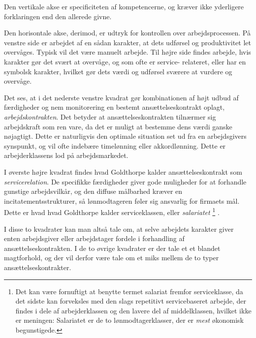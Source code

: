 Den vertikale akse er specificiteten af kompetencerne, og kræver ikke yderligere forklaringen end den allerede givne.

Den horisontale akse, derimod, er udtryk for kontrollen over arbejdsprocessen. På venstre side er arbejdet af en sådan karakter, at dets udførsel og produktivitet let overvåges. Typisk vil det være manuelt arbejde.   
Til højre side findes arbejde, hvis karakter gør det svært at overvåge, og som ofte er service- relateret, eller har en symbolsk karakter, hvilket gør dets værdi og udførsel sværere at vurdere og overvåge. 

Det ses, at i det nederste venstre kvadrat gør kombinationen af højt udbud af færdigheder og nem monitorering en bestemt ansættelseskontrakt oplagt, \emph{arbejdskontrakten}. Det betyder at ansættelseskontrakten tilnærmer sig arbejdskraft som ren vare, da det er muligt at bestemme dens værdi ganske nøjagtigt. Dette er naturligvis den optimale situation set ud fra en arbejdsgivers synspunkt, og vil ofte indebære timelønning eller akkordlønning. Dette er arbejderklassens lod på arbejdsmarkedet. %

I øverste højre kvadrat findes hvad Goldthorpe kalder ansættelseskontrakt som \emph{servicerelation}. De specifikke færdigheder giver gode muligheder for at forhandle gunstige arbejdsvilkår, og den diffuse målbarhed  kræver en incitatementsstrukturer, så lønmodtageren føler sig ansvarlig for firmaets mål. Dette er hvad hvad Goldthorpe kalder serviceklassen, eller \emph{salariatet}%
%
\footnote{Det kan være fornuftigt at benytte termet salariat fremfor serviceklasse, da det sidste kan forveksles med den slags repetitivt servicebaseret arbejde, der findes i dele af arbejderklassen og den lavere del af middelklassen, hvilket ikke er meningen: Salariatet er de to lønmodtagerklasser, der er \emph{mest} økonomisk begunstigede.}%
%
 \parencite[22]{GoldthorpeMcKnight2004}. %

I disse to kvadrater kan man altså tale om, at selve arbejdets karakter giver enten arbejdsgiver eller arbejdstager fordele i forhandling af ansættelseskontrakten. I de to øvrige kvadrater er der tale et et blandet magtforhold, og der vil derfor være tale om et miks mellem de to typer ansættelseskontrakter. 

